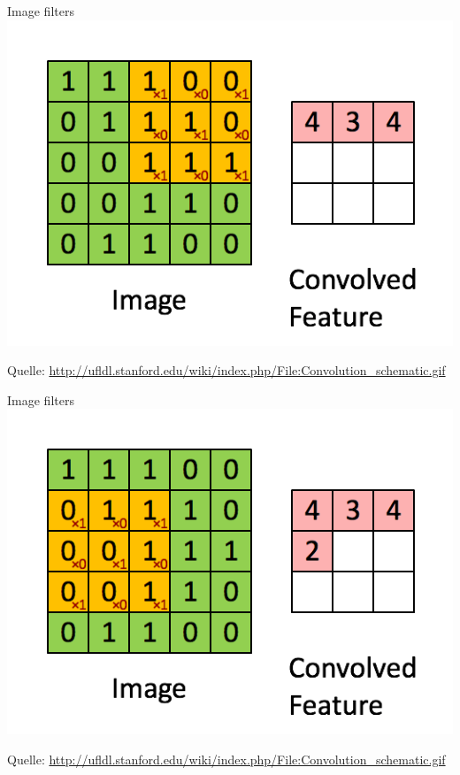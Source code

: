 \begin{frame}{Image filters}
    \includegraphics[width=\textwidth, height=0.8\textheight, keepaspectratio]{../presentation-images/image-filter-2.png}

    Quelle: \href{http://ufldl.stanford.edu/wiki/index.php/File:Convolution_schematic.gif}{http://ufldl.stanford.edu/wiki/index.php/File:Convolution\_schematic.gif}
\end{frame}

\begin{frame}{Image filters}
    \includegraphics[width=\textwidth, height=0.8\textheight, keepaspectratio]{../presentation-images/image-filter-3.png}

    Quelle: \href{http://ufldl.stanford.edu/wiki/index.php/File:Convolution_schematic.gif}{http://ufldl.stanford.edu/wiki/index.php/File:Convolution\_schematic.gif}
\end{frame}

